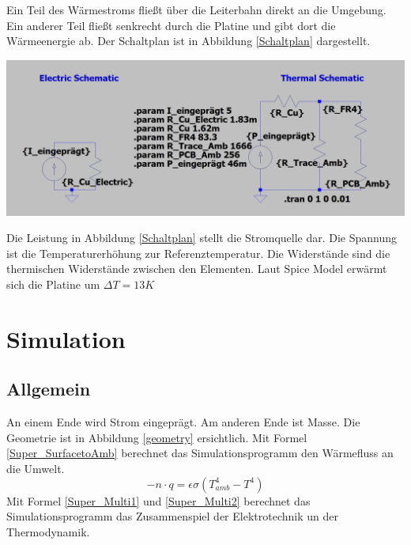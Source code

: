 \documentclass[10pt,a4paper,oneside,abstracton]{scrartcl}
\newenvironment{Figure}
  {\par\medskip\noindent\minipage{\linewidth}}
  {\endminipage\par\medskip}
\begin{document}
\begin{multicols}{2}
Ein Teil des Wärmestroms fließt über die Leiterbahn direkt an die Umgebung. 
\newline
Ein anderer Teil fließt senkrecht durch die Platine und gibt dort die Wärmeenergie ab. 
Der Schaltplan ist in Abbildung \ref*{Schaltplan} dargestellt. 
\begin{Figure}
	\includegraphics[width=\textwidth]{Bilder/Schaltplan.png}
	\label{Schaltplan}
\end{Figure}
\noindent
Die Leistung in Abbildung \ref{Schaltplan} stellt die Stromquelle dar. 
Die Spannung ist die Temperaturerhöhung zur Referenztemperatur. 
Die Widerstände sind die thermischen Widerstände zwischen den Elementen. 
\newline
Laut Spice Model erwärmt sich die Platine um $\Delta T = 13K$


\section{Simulation}
\subsection{Allgemein}
An einem Ende wird Strom eingeprägt. Am anderen Ende ist Masse.
Die Geometrie ist in Abbildung \ref*{geometry} ersichtlich.
\newline
Mit Formel \ref*{Super_SurfacetoAmb} berechnet das Simulationsprogramm den Wärmefluss an die Umwelt.
\begin{equation}
	-n \cdot q = \epsilon \sigma (T^4_{amb} - T^4)
	\label{Super_SurfacetoAmb}
	\end{equation}
	\noindent
	Mit Formel \ref*{Super_Multi1} und \ref*{Super_Multi2} berechnet das Simulationsprogramm das Zusammenspiel der Elektrotechnik un der Thermodynamik.


\end{multicols}
\end{document}

